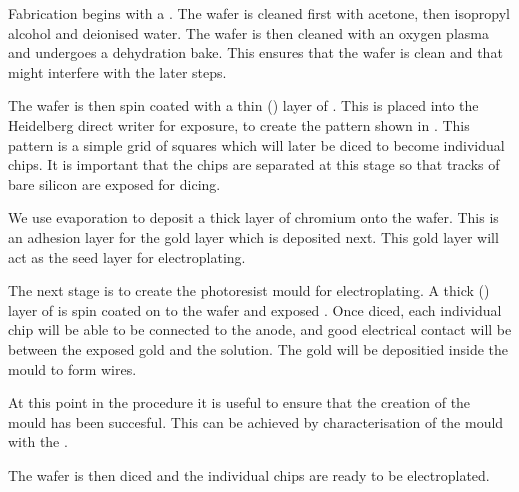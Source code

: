 Fabrication begins with a . The wafer is cleaned first
with acetone, then isopropyl alcohol and deionised water. The wafer is then
cleaned with an oxygen plasma and undergoes a dehydration bake.  This ensures
that the wafer is clean and  that might
interfere with the later steps.

The wafer is then spin coated with a thin () layer of . This is placed into the Heidelberg direct writer for exposure, to
create the pattern shown in . This pattern is a simple grid of
 squares which will later be diced to become individual chips.
It is important that the chips are separated at this stage so that tracks of
bare silicon are exposed for dicing.

We use evaporation to deposit a  thick layer of chromium onto the
wafer. This is an adhesion layer for the  gold layer which is
deposited next. This gold layer will act as the seed layer for electroplating.

The next stage is to create the photoresist mould for electroplating. A thick
() layer of  is spin coated on to the
wafer and exposed . Once diced, each
individual chip will be able to be connected to the anode, and good electrical
contact will be  between the exposed gold and the solution. The gold
will be depositied inside the mould to form wires.

At this point in the procedure it is useful to ensure that the creation of
the mould has been succesful. This can be achieved by characterisation of the
mould with the . 

The wafer is then diced and the individual chips are ready to be electroplated.

